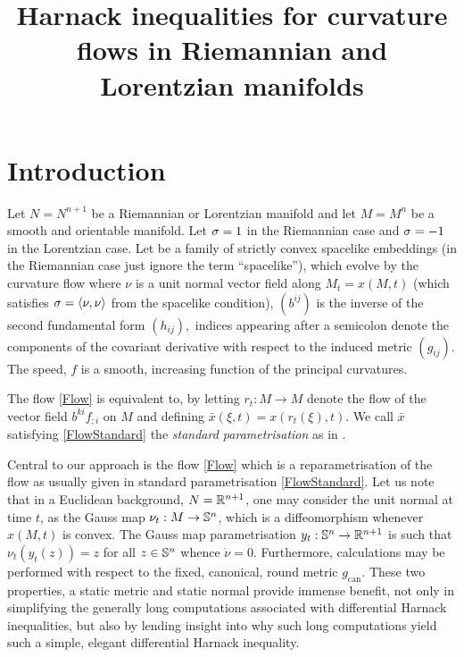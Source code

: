 



\title[Harnack inequalities for curvature flows]{Harnack inequalities for curvature flows in Riemannian and Lorentzian manifolds}

\maketitle
\section{Introduction}
\label{sec:intro}
Let $N=N^{n+1}$ be a Riemannian or Lorentzian manifold and let $M=M^{n}$ be a smooth and orientable manifold. Let $\s = 1$ in the Riemannian case and $\s = -1$ in the Lorentzian case. Let
\eq{x\cn M\x[0,T^{\ast})\ra N}
be a family of strictly convex spacelike embeddings (in the Riemannian case just ignore the term ``spacelike''), which evolve by the curvature flow
where $\nu$ is a unit normal vector field along $M_{t}=x(M,t)$ (which satisfies $\s=\ip{\nu}{\nu}$ from the spacelike condition), $(b^{ij})$ is the inverse of the second fundamental form $(h_{ij}),$ indices appearing after a semicolon denote the components of the covariant derivative with respect to the induced metric $(g_{ij})$. The speed, $f$ is a smooth, increasing function of the principal curvatures.

The flow \eqref{Flow} is equivalent to,
by letting \(r_t:M\to M\) denote the flow of the vector field $b^{ki}f_{;i}$ on $M$ and defining $\bar{x} (\xi, t) = x (r_t(\xi), t)$. We call $\bar{x}$ satisfying \eqref{FlowStandard} the \emph{standard parametrisation} as in \cite{Andrews:09/1994}.

Central to our approach is the flow \eqref{Flow} which is a reparametrisation of the flow as usually given in standard parametrisation \eqref{FlowStandard}. Let us note that in a Euclidean background, $N = \R^{n+1}$, one may consider the unit normal at time $t$, as the Gauss map $\nu_t : M \to \S^n$, which is a diffeomorphism whenever $x(M,t)$ is convex. The Gauss map parametrisation $y_t: \S^n \to \R^{n+1}$ \cite{Andrews:09/1994} is such that $\nu_t(y_t(z)) = z$ for all $z \in \S^n$ whence $\dot{\nu} = 0$. Furthermore, calculations may be performed with respect to the fixed, canonical, round metric $g_{\operatorname{can}}$. These two properties, a static metric and static normal provide immense benefit, not only in simplifying the generally long computations associated with differential Harnack inequalities, but also by lending insight into why such long computations yield such a simple, elegant differential Harnack inequality.

